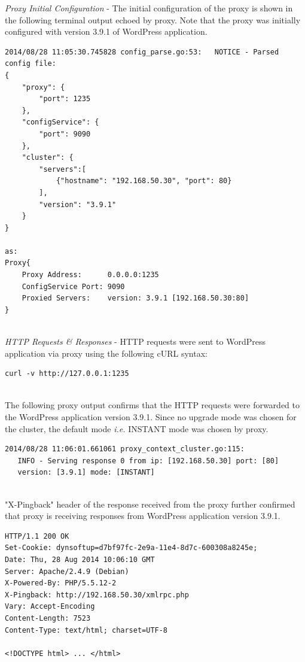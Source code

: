 \documentclass[a4paper,11pt,twoside]{report}
\begin{document}
\noindent
\textit{Proxy Initial Configuration} - The initial configuration of the proxy is shown in the following terminal output echoed by proxy. Note that the proxy was initially configured with version 3.9.1 of WordPress application.\smallskip

\begin{lstlisting}[language=terminal]
2014/08/28 11:05:30.745828 config_parse.go:53:   NOTICE - Parsed config file:
{
    "proxy": {
        "port": 1235
    },
    "configService": {
        "port": 9090
    },
    "cluster": {
        "servers":[
            {"hostname": "192.168.50.30", "port": 80}
        ],
        "version": "3.9.1"
    }
}

as:
Proxy{
	Proxy Address:      0.0.0.0:1235
	ConfigService Port: 9090
	Proxied Servers:    version: 3.9.1 [192.168.50.30:80]
}
\end{lstlisting}

\noindent\\
\textit{HTTP Requests \& Responses} - HTTP requests were sent to WordPress application via proxy using the following cURL syntax:\smallskip

\begin{lstlisting}[language=terminal]
curl -v http://127.0.0.1:1235
\end{lstlisting}

\noindent\\
The following proxy output confirms that the HTTP requests were forwarded to the WordPress application version 3.9.1. Since no upgrade mode was chosen for the cluster, the default mode \textit{i.e.} INSTANT mode was chosen by proxy. \smallskip

\begin{lstlisting}[language=terminal]
2014/08/28 11:06:01.661061 proxy_context_cluster.go:115:     
   INFO - Serving response 0 from ip: [192.168.50.30] port: [80] 
   version: [3.9.1] mode: [INSTANT]
\end{lstlisting}

\noindent\\
"X-Pingback" header of the response received from the proxy further confirmed that proxy is receiving responses from WordPress application version 3.9.1.\smallskip 

\begin{lstlisting}[language=terminal]
HTTP/1.1 200 OK
Set-Cookie: dynsoftup=d7bf97fc-2e9a-11e4-8d7c-600308a8245e;
Date: Thu, 28 Aug 2014 10:06:10 GMT
Server: Apache/2.4.9 (Debian)
X-Powered-By: PHP/5.5.12-2
X-Pingback: http://192.168.50.30/xmlrpc.php
Vary: Accept-Encoding
Content-Length: 7523
Content-Type: text/html; charset=UTF-8
 
<!DOCTYPE html> ... </html>
\end{lstlisting}
\end{document}
